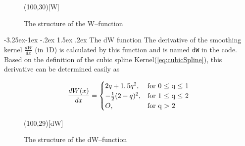 \documentclass[11pt,a4paper,twoside]{report}
\makeatletter
\renewcommand\paragraph{\@startsection{paragraph}{4}{\z@}%
  {-3.25ex\@plus -1ex \@minus -.2ex}%
  {1.5ex \@plus .2ex}%
  {\normalfont\normalsize\bfseries}}
\makeatother
\begin{document}
\begin{figure}[H]
\label{fig:W_structure}  

\begin{center}
\begin{struktogramm}(100,30)[W]
    \caseend
\end{struktogramm}
\end{center}

\caption{The structure of the W--function}
\end{figure}

\paragraph{The dW function}
The derivative of the smoothing kernel $\frac{dW}{dx}$ (in 1D) is calculated by this function and is named {\tt dW} in the code. Based on the definition of the cubic spline Kernel(\ref{eq:cubicSpline}), this derivative can be determined easily as

\begin{equation}
\label{eq:cubicSplineDer}
\frac{dW(x)}{dx}=\begin{cases}
\-2q+1,5q^2,& \text{for 0 $\leq$ q $\leq$ 1} \\
-\frac{1}{2}(2-q)^{2},&  \text{for 1 $\leq$ q $\leq$ 2} \\
O,& \text{for q $>$ 2}
\end{cases}
\end{equation}


\begin{figure}[H]
\label{fig:dW_structure}  

\begin{center}
\begin{struktogramm}(100,29)[dW]
    \caseend

\end{struktogramm}
\end{center}

\caption{The structure of the dW--function}
\end{figure}
\end{document}
